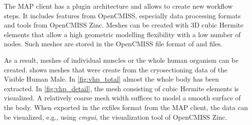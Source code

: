 The MAP client has a plugin architecture and allows to create new workflow steps. It includes features from OpenCMISS, especially data processing formats and tools from OpenCMISS Zinc. Meshes can be created with 3D cubic Hermite elements that allow a high geometric modelling flexibility with a low number of nodes. Such meshes are stored in the OpenCMISS file format of  and  files.

As a result, meshes of individual muscles or the whole human organism can be created.  shows meshes that were create from the cryosectioning data of the Visible Human Male. In \cref{fig:vhp_total} almost the whole body has been extracted. In \cref{fig:vhp_detail}, the mesh consisting of cubic Hermite elements is visualized. A relatively coarse mesh width suffices to model a smooth surface of the body. When exported in the exfiles format from the MAP client, the data can be visualized, e.g., using \emph{cmgui}, the visualization tool of OpenCMISS Zinc.

